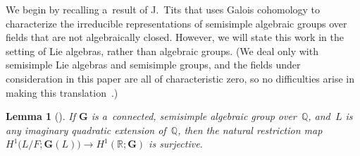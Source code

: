 \documentclass[10pt,a4paper]{amsart}
\numberwithin{equation}{section}
\newtheorem{lem}[prop]{Lemma}
{\theoremstyle{definition}
\newtheorem{defn}[prop]{Definition}
\newtheorem{notation}[prop]{Notation}
\newtheorem{rem}[prop]{Remark}
\newtheorem{ques}[prop]{Question}
\newtheorem{eg}[prop]{Example}
\newtheorem{erratum}[prop]{Erratum}}
\begin{document}
We begin by recalling a~result of J.~Tits that uses Galois cohomology to characterize the irreducible representations of
semisimple algebraic groups over f\/ields that are not algebraically closed.
However, we will state this work in the setting of Lie algebras, rather than algebraic groups.
(We deal only with semisimple Lie algebras and semisimple groups, and the f\/ields under consideration in this paper are
all of characteristic zero, so no dif\/f\/iculties arise in making this translation~\cite[Proposition~7.3.1(iii), p.~393]{DemazureGrothendieck-SGA3}.)

\begin{lem}[]\label{KneserHasse}
If $\mathbf{G}$ is a~connected, semisimple algebraic group over~$\mathbb{Q}$, and~$L$ is any imaginary quadratic
extension of~$\mathbb{Q}$, then the natural restriction map $H^1 \bigl(L/F; \mathbf{G}(L) \bigr) \to H^1 (\mathbb{R};
\mathbf{G})$ is surjective.
\end{lem}
\end{document}
